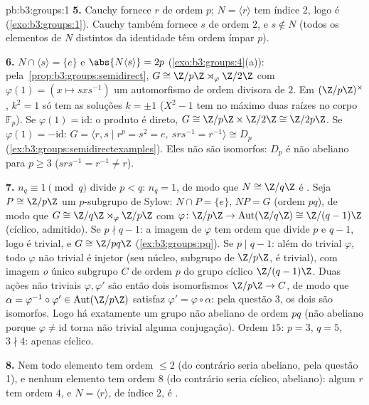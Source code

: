 \begin{solution}{pb:b3:groups:1}
\textbf{5.} Cauchy fornece $r$ de ordem $p$; $N = \langle r
\rangle$ tem índice
$2$, logo é  (\cref{exo:b3:groups:1}). Cauchy também fornece $s$
de ordem $2$, e $s \notin N$ (todos os elementos de $N$ distintos da
identidade têm ordem ímpar $p$).

\textbf{6.} $N \cap \langle s \rangle = \{e\}$ e $\abs{N\langle
s\rangle} = 2p$ (\cref{exo:b3:groups:4}(a)): pela~\cref{prop:b3:groups:semidirect},
$G \cong \Z/p\Z \rtimes_\varphi
\Z/2\Z$ com $\varphi(1) = (x \mapsto sxs^{-1})$ um automorfismo de ordem divisora de $2$. Em $(\Z/p\Z)^\times$,
$k^2 = 1$ só tem as soluções $k = \pm 1$ ($X^2 - 1$ tem no máximo duas raízes no corpo
$\mathbb F_p$). Se $\varphi(1) = \mathrm{id}$: o produto é direto, $G \cong \Z/p\Z \times \Z/2\Z \cong \Z/2p\Z$. Se $\varphi(1) = -\mathrm{id}$: $G = \langle r, s \mid r^p = s^2 = e,
\ srs^{-1} = r^{-1}\rangle \cong D_p$
(\cref{ex:b3:groups:semidirectexamples}). Eles não são isomorfos: $D_p$ é não abeliano para
$p \geq 3$ ($srs^{-1} = r^{-1} \neq r$).

\textbf{7.} $n_q \equiv 1 \pmod q$ divide $p < q$: $n_q = 1$, de modo que $N \cong \Z/q\Z$ é .
Seja $P \cong \Z/p\Z$ um $p$-subgrupo de Sylow: $N \cap P = \{e\}$, $NP = G$ (ordem
$pq$), de modo que $G
\cong \Z/q\Z \rtimes_\varphi \Z/p\Z$ com $\varphi \colon \Z/p\Z
\to \operatorname{Aut}(\Z/q\Z) \cong \Z/(q-1)\Z$ (cíclico, admitido). Se $p \nmid q - 1$: a
imagem de $\varphi$ tem ordem que divide $p$ e $q-1$, logo é trivial,
e $G \cong
\Z/pq\Z$ (\cref{ex:b3:groups:pq}). Se $p \mid q - 1$: além do trivial $\varphi$, todo $\varphi$ não
trivial é injetor (seu núcleo, subgrupo de $\Z/p\Z$, é trivial), com
imagem \emph{o} único subgrupo $C$ de ordem $p$ do grupo cíclico
$\Z/(q-1)\Z$. Duas ações não triviais $\varphi, \varphi'$ são então dois isomorfismos $\Z/p\Z \to C$,
de modo que $\alpha =
\varphi^{-1}\circ\varphi' \in \operatorname{Aut}(\Z/p\Z)$ satisfaz $\varphi' = \varphi\circ\alpha$: pela questão 3, os dois  são isomorfos. Logo há exatamente um grupo não abeliano de
ordem $pq$ (não abeliano porque $\varphi \neq
\mathrm{id}$ torna não trivial alguma
conjugação). Ordem $15$: $p =
3$, $q = 5$, $3 \nmid 4$: apenas
cíclico.

\textbf{8.} Nem todo elemento tem ordem $\leq 2$ (do contrário seria
abeliano, pela questão 1), e nenhum elemento tem ordem $8$ (do
contrário seria cíclico, abeliano): algum $r$ tem ordem $4$, e
$N = \langle r\rangle$, de índice $2$, é .


\end{solution}
